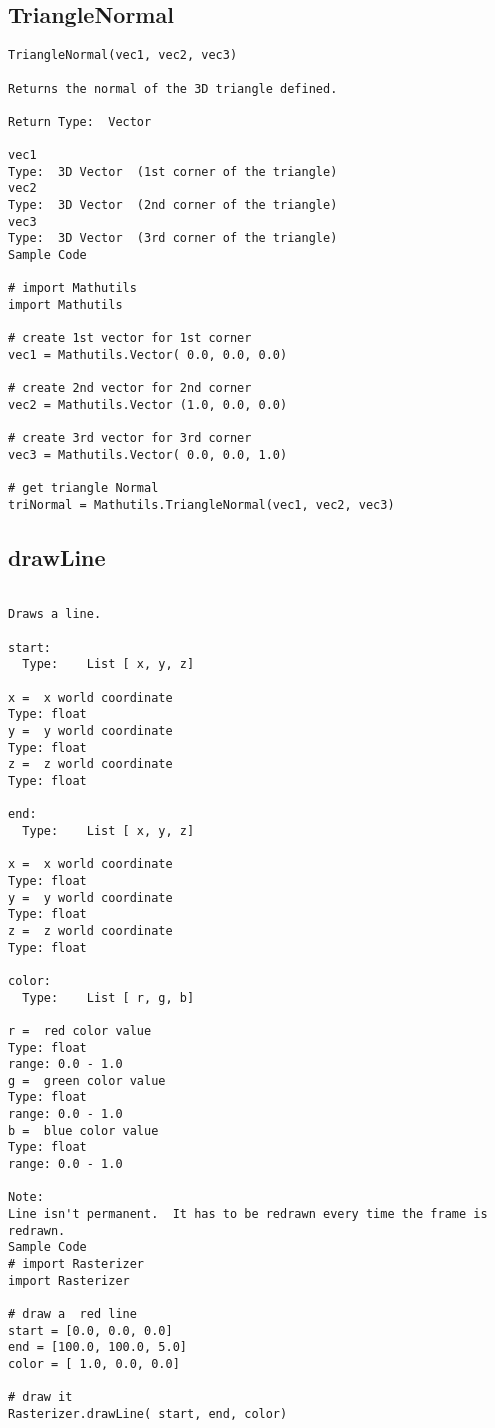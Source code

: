 \subsection{TriangleNormal}

\begin{verbatim}
TriangleNormal(vec1, vec2, vec3)

Returns the normal of the 3D triangle defined.

Return Type:  Vector

vec1
Type:  3D Vector  (1st corner of the triangle)
vec2
Type:  3D Vector  (2nd corner of the triangle)
vec3
Type:  3D Vector  (3rd corner of the triangle)
Sample Code

# import Mathutils
import Mathutils

# create 1st vector for 1st corner
vec1 = Mathutils.Vector( 0.0, 0.0, 0.0)

# create 2nd vector for 2nd corner
vec2 = Mathutils.Vector (1.0, 0.0, 0.0)

# create 3rd vector for 3rd corner
vec3 = Mathutils.Vector( 0.0, 0.0, 1.0)

# get triangle Normal
triNormal = Mathutils.TriangleNormal(vec1, vec2, vec3)
\end{verbatim}


\subsection{drawLine}

\begin{verbatim}

Draws a line.

start:
  Type:    List [ x, y, z]

x =  x world coordinate
Type: float
y =  y world coordinate
Type: float
z =  z world coordinate
Type: float

end:
  Type:    List [ x, y, z]

x =  x world coordinate
Type: float
y =  y world coordinate
Type: float
z =  z world coordinate
Type: float

color:
  Type:    List [ r, g, b]

r =  red color value
Type: float
range: 0.0 - 1.0
g =  green color value
Type: float
range: 0.0 - 1.0
b =  blue color value
Type: float
range: 0.0 - 1.0

Note:
Line isn't permanent.  It has to be redrawn every time the frame is redrawn.    
Sample Code
# import Rasterizer
import Rasterizer

# draw a  red line
start = [0.0, 0.0, 0.0]
end = [100.0, 100.0, 5.0]
color = [ 1.0, 0.0, 0.0]

# draw it
Rasterizer.drawLine( start, end, color)
\end{verbatim}

